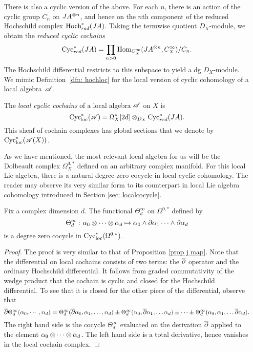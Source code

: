 There is also a cyclic version of the above. 
For each $n$, there is an action of the cyclic group $C_n$ on $JA^{\otimes n}$,
and hence on the $n$th component of the reduced Hochschild complex ${\rm Hoch}_{red}^* (JA)$.
Taking the termwise quotient $D_X$-module, we obtain the {\em reduced cyclic cochains}
\[
{\rm Cyc}_{red}^* (JA) = \prod_{n > 0} {\rm Hom}_{C^\infty_X} (JA^{\otimes n}, C^\infty_X) / C_n .
\]
The Hochschild differential restricts to this subspace to yield a dg $D_X$-module. 
We mimic Definition~\ref{dfn: hochloc} for the local version of cyclic cohomology of a local algebra~$\mathscr A$. 

\begin{dfn}\label{dfn: cycloc}
The {\em local cyclic cochains} of a local algebra $\mathscr A$ on $X$ is 
\[
{\rm Cyc}_{\rm loc}^*(\mathscr A) = \Omega^*_X[2d] \otimes_{D_X} {\rm Cyc}^*_{red} (JA) .
\] 
This sheaf of cochain complexes has global sections that we denote by~${\rm Cyc}_{\rm loc}^*(\mathscr A(X))$.
\end{dfn}

As we have mentioned, the most relevant local algebra for us will be the Dolbeault complex $\Omega^{0,*}_X$ defined on an arbitrary complex manifold. 
For this local Lie algebra, there is a natural degree zero cocycle in local cyclic cohomology.
The reader may observe its very similar form to its counterpart in local Lie algebra cohomology introduced in Section \ref{sec: localcocycle}. 

\begin{lem}
\label{lem: univ}
Fix a complex dimension $d$. 
The functional $\Theta^\infty_d$ on $\Omega^{0,*}$ defined by
\[
\Theta^\infty_d : \alpha_0 \otimes \cdots \otimes \alpha_d \mapsto \alpha_0 \wedge \partial \alpha_1 \cdots \wedge \partial \alpha_d
\]
is a degree zero cocycle in ${\rm Cyc}_{\rm loc}^*(\Omega^{0,*})$. 
\end{lem}
\begin{proof}
The proof is very similar to that of Proposition \ref{prop j map}. 
Note that the differential on local cochains consists of two terms: the $\overline{\partial}$ operator and the ordinary Hochschild differential. 
It follows from graded commutativity of the wedge product that the cochain is cyclic and closed for the Hochschild differential. 
To see that it is closed for the other piece of the differential, observe that
\[
\overline{\partial} \Theta^\infty_d(\alpha_0,\cdots,\alpha_d) = \Theta^\infty_d(\overline{\partial} \alpha_0, \alpha_1,\ldots,\alpha_d) \pm \Theta_d^\infty(\alpha_0, \overline{\partial} \alpha_1,\ldots \alpha_d) \pm \cdots \pm \Theta_d^\infty(\alpha_0, \alpha_1,\ldots \overline{\partial} \alpha_d) .
\]
The right hand side is the cocycle $\Theta_d^\infty$ evaluated on the derivation $\overline{\partial}$ applied to the element $\alpha_0 \otimes \cdots \otimes \alpha_d$. 
The left hand side is a total derivative, hence vanishes in the local cochain complex. 
\end{proof}

